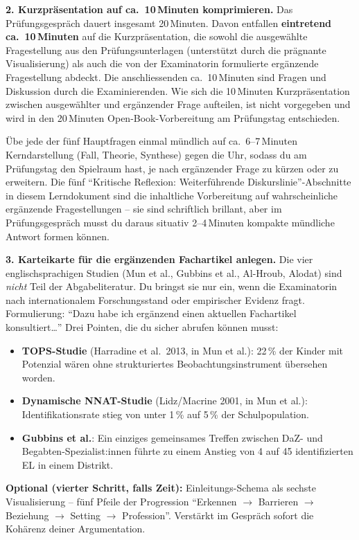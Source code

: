 \documentclass[ngerman, a4paper]{article}
\begin{document}
\begin{todojuni}
\medskip
\textbf{2. Kurzpräsentation auf ca.\ 10\,Minuten komprimieren.}
Das Prüfungsgespräch dauert insgesamt 20\,Minuten. Davon entfallen \textbf{eintretend ca.\ 10\,Minuten} auf die Kurzpräsentation, die sowohl die ausgewählte Fragestellung aus den Prüfungsunterlagen (unterstützt durch die prägnante Visualisierung) als auch die von der Examinatorin formulierte ergänzende Fragestellung abdeckt. Die anschliessenden ca.\ 10\,Minuten sind Fragen und Diskussion durch die Examinierenden. Wie sich die 10\,Minuten Kurzpräsentation zwischen ausgewählter und ergänzender Frage aufteilen, ist nicht vorgegeben und wird in den 20\,Minuten Open-Book-Vorbereitung am Prüfungstag entschieden.

Übe jede der fünf Hauptfragen einmal mündlich auf ca.\ 6--7\,Minuten Kerndarstellung (Fall, Theorie, Synthese) gegen die Uhr, sodass du am Prüfungstag den Spielraum hast, je nach ergänzender Frage zu kürzen oder zu erweitern. Die fünf \enquote{Kritische Reflexion: Weiterführende Diskurslinie}-Abschnitte in diesem Lerndokument sind die inhaltliche Vorbereitung auf wahrscheinliche ergänzende Fragestellungen -- sie sind schriftlich brillant, aber im Prüfungsgespräch musst du daraus situativ 2--4\,Minuten kompakte mündliche Antwort formen können.

\medskip
\textbf{3. Karteikarte für die ergänzenden Fachartikel anlegen.}
Die vier englischsprachigen Studien (Mun et al., Gubbins et al., Al-Hroub, Alodat) sind \textit{nicht} Teil der Abgabeliteratur. Du bringst sie nur ein, wenn die Examinatorin nach internationalem Forschungsstand oder empirischer Evidenz fragt. Formulierung: \enquote{Dazu habe ich ergänzend einen aktuellen Fachartikel konsultiert\ldots} Drei Pointen, die du sicher abrufen können musst:
\begin{itemize}\setlength{\itemsep}{0pt}
  \item \textbf{TOPS-Studie} (Harradine et al.\ 2013, in Mun et al.): 22\,\% der Kinder mit Potenzial wären ohne strukturiertes Beobachtungsinstrument übersehen worden.
  \item \textbf{Dynamische NNAT-Studie} (Lidz/Macrine 2001, in Mun et al.): Identifikationsrate stieg von unter 1\,\% auf 5\,\% der Schulpopulation.
  \item \textbf{Gubbins et al.}: Ein einziges gemeinsames Treffen zwischen DaZ- und Begabten-Spezialist:innen führte zu einem Anstieg von 4 auf 45 identifizierten EL in einem Distrikt.
\end{itemize}

\medskip
\textbf{Optional (vierter Schritt, falls Zeit):}
Einleitungs-Schema als sechste Visualisierung -- fünf Pfeile der Progression \enquote{Erkennen $\rightarrow$ Barrieren $\rightarrow$ Beziehung $\rightarrow$ Setting $\rightarrow$ Profession}. Verstärkt im Gespräch sofort die Kohärenz deiner Argumentation.
\end{todojuni}
\end{document}
